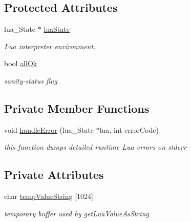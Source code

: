 \subsection*{Protected Attributes}
\begin{CompactItemize}
\item 
lua\_\-State $\ast$ \hyperlink{classEOSLuaEnvironment_0658d1e689f5a6cccdf4456a6a938b6f}{luaState}
\begin{CompactList}\small\item\em Lua interpreter environment. \item\end{CompactList}\item 
bool \hyperlink{classEOSLuaEnvironment_575f4654bd2650a110661fd4e4d56a6d}{allOk}
\begin{CompactList}\small\item\em sanity-status flag \item\end{CompactList}\end{CompactItemize}
\subsection*{Private Member Functions}
\begin{CompactItemize}
\item 
void \hyperlink{classEOSLuaEnvironment_8d4d4493b7762dc75eedcd5c5313b472}{handleError} (lua\_\-State $\ast$lua, int errorCode)
\begin{CompactList}\small\item\em this function dumps detailed runtime Lua errors on stderr \item\end{CompactList}\end{CompactItemize}
\subsection*{Private Attributes}
\begin{CompactItemize}
\item 
char \hyperlink{classEOSLuaEnvironment_38958bc6b0b6e68b9a66b6e9ff21f5ec}{tempValueString} \mbox{[}1024\mbox{]}
\begin{CompactList}\small\item\em temporary buffer used by getLuaValueAsString \item\end{CompactList}\end{CompactItemize}


